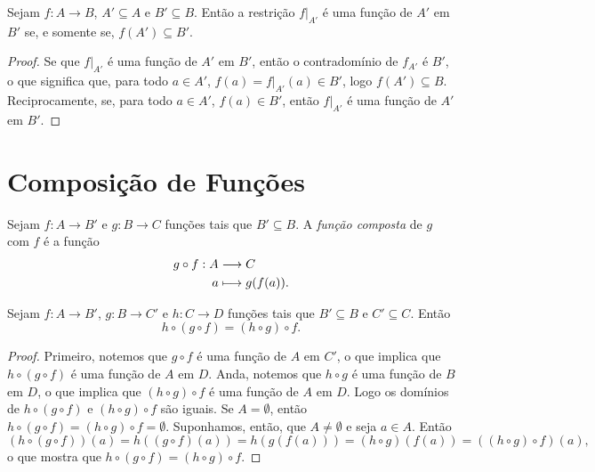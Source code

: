 \begin{prop}\label{conj:prop.func.rest.ig}
	Sejam $f: A \to B$, $A' \subseteq A$ e $B' \subseteq B$. Então a restrição $f|_{A'}$ é uma função de $A'$ em $B'$ se, e somente se, $f(A') \subseteq B'$.
\end{prop}
\begin{proof}
	Se que $f|_{A'}$ é uma função de $A'$ em $B'$, então o contradomínio de $f_{A'}$ é $B'$, o que significa que, para todo $a \in A'$, $f(a) = f|_{A'}(a) \in B'$, logo $f(A') \subseteq B$. Reciprocamente, se, para todo $a \in A'$, $f(a) \in B'$, então $f|_{A'}$ é uma função de $A'$ em $B'$.
\end{proof}

\section{Composição de Funções}

\begin{defi}
	Sejam $f: A \to B'$ e $g: B \to C$ funções tais que $B' \subseteq B$. A \emph{função composta} de $g$ com $f$ é a função
	\begin{align*}
	{g \circ f }: {A} &\longrightarrow {C} \\{a} &\longmapsto {g(f(a))}.
	\end{align*}
\end{defi}

\begin{prop}
\label{prop:comp.func.asso}
	Sejam $f: A \to B'$, $g: B \to C'$ e $h: C \to D$ funções tais que $B' \subseteq B$ e $C' \subseteq C$. Então
	\begin{equation*}
	h \circ (g \circ f) = (h \circ g) \circ f.
	\end{equation*}
\end{prop}
\begin{proof}
	Primeiro, notemos que $g \circ f$ é uma função de $A$ em $C'$, o que implica que $h \circ (g \circ f)$ é uma função de $A$ em $D$. Anda, notemos que $h \circ g$ é uma função de $B$ em $D$, o que implica que $(h \circ g) \circ f$ é uma função de $A$ em $D$. Logo os domínios de $h \circ (g \circ f)$ e $(h \circ g) \circ f$ são iguais. Se $A=\emptyset$, então $h \circ (g \circ f) = (h \circ g) \circ f = \emptyset$. Suponhamos, então, que $A \neq \emptyset$ e seja $a \in A$. Então
	\begin{equation*}
	(h \circ (g \circ f))(a) = h((g \circ f)(a)) = h(g(f(a))) = (h \circ g)(f(a)) = ((h \circ g) \circ f)(a),
	\end{equation*}
o que mostra que $h \circ (g \circ f) = (h \circ g) \circ f$. 
\end{proof}


